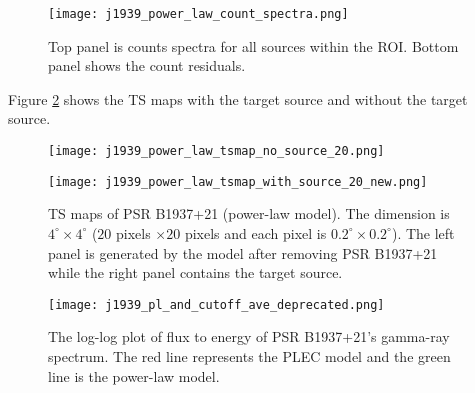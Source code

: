 \documentclass[a4paper, 12pt]{report}
\begin{document}
        \begin{figure}
          \centering 
          \texttt{[image: j1939\_power\_law\_count\_spectra.png]}
          \caption{Top panel is counts spectra for all sources within the ROI. Bottom panel  
            shows the count residuals. }
          \label{fig: j1939_power_law_count_spectra}
        \end{figure}

        Figure \ref{fig: j1939_power_law_tsmap_withsource_20} shows the TS maps with the 
        target source and without the target source. 

        \begin{figure}[!htp]
          \begin{center}
          \begin{minipage}{0.45\textwidth}
            \begin{center} 
              \texttt{[image: j1939\_power\_law\_tsmap\_no\_source\_20.png]}
            \end{center}
          \end{minipage}
          \begin{minipage}{0.45\textwidth}
            \begin{center}
              \texttt{[image: j1939\_power\_law\_tsmap\_with\_source\_20\_new.png]}
            \end{center}
          \end{minipage}
        \end{center}

          \caption[TS maps of PSR B1937+21 (power-law model).]
            {TS maps of PSR B1937+21 (power-law model). The dimension is $4^{\circ} \times 4^{\circ}$
            ($20$ pixels $\times 20$ pixels and each pixel is 
            $0.2^{\circ} \times 0.2^{\circ}$). The left panel is generated by the model 
            after removing PSR B1937+21 while the right panel contains the target source.}
          \label{fig: j1939_power_law_tsmap_withsource_20}
        \end{figure}

        \begin{figure}[!htp]
          \centering
          \texttt{[image: j1939\_pl\_and\_cutoff\_ave\_deprecated.png]}
          \caption[The log-log plot of flux to energy of PSR B1937+21’s gamma-ray spectrum.]
            {The log-log plot of flux to energy of PSR B1937+21’s gamma-ray spectrum.
            The red line represents the PLEC model and the green line is the power-law
            model. }
          \label{fig: j1939_pl_and_cutoff_ave}
        \end{figure}
\end{document}
